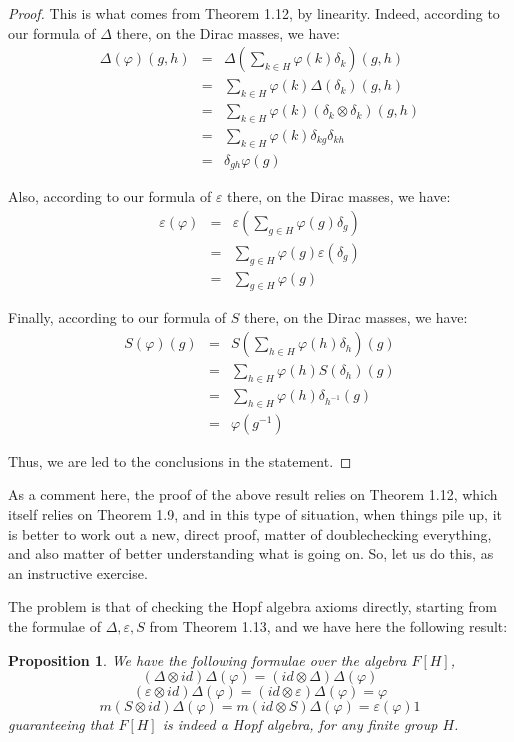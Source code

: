 \documentclass[12pt]{amsbook}
\newtheorem{proposition}[theorem]{Proposition}
\begin{document}
\begin{proof}
This is what comes from Theorem 1.12, by linearity. Indeed, according to our formula of $\Delta$ there, on the Dirac masses, we have:
\begin{eqnarray*}
\Delta(\varphi)(g,h)
&=&\Delta\left(\sum_{k\in H}\varphi(k)\delta_k\right)(g,h)\\
&=&\sum_{k\in H}\varphi(k)\Delta(\delta_k)(g,h)\\
&=&\sum_{k\in H}\varphi(k)(\delta_k\otimes\delta_k)(g,h)\\
&=&\sum_{k\in H}\varphi(k)\delta_{kg}\delta_{kh}\\
&=&\delta_{gh}\varphi(g)
\end{eqnarray*}

Also, according to our formula of $\varepsilon$ there, on the Dirac masses, we have:
\begin{eqnarray*}
\varepsilon(\varphi)
&=&\varepsilon\left(\sum_{g\in H}\varphi(g)\delta_g\right)\\
&=&\sum_{g\in H}\varphi(g)\varepsilon(\delta_g)\\
&=&\sum_{g\in H}\varphi(g)
\end{eqnarray*}

Finally, according to our formula of $S$ there, on the Dirac masses, we have:
\begin{eqnarray*}
S(\varphi)(g)
&=&S\left(\sum_{h\in H}\varphi(h)\delta_h\right)(g)\\
&=&\sum_{h\in H}\varphi(h)S(\delta_h)(g)\\
&=&\sum_{h\in H}\varphi(h)\delta_{h^{-1}}(g)\\
&=&\varphi(g^{-1})
\end{eqnarray*}

Thus, we are led to the conclusions in the statement.
\end{proof}

As a comment here, the proof of the above result relies on Theorem 1.12, which itself relies on Theorem 1.9, and in this type of situation, when things pile up, it is better to work out a new, direct proof, matter of doublechecking everything, and also matter of better understanding what is going on. So, let us do this, as an instructive exercise.

\bigskip

The problem is that of checking the Hopf algebra axioms directly, starting from the formulae of $\Delta,\varepsilon,S$ from Theorem 1.13, and we have here the following result:

\begin{proposition}
We have the following formulae over the algebra $F[H]$,
$$(\Delta\otimes id)\Delta(\varphi)=(id\otimes \Delta)\Delta(\varphi)$$
$$(\varepsilon\otimes id)\Delta(\varphi)=(id\otimes\varepsilon)\Delta(\varphi)=\varphi$$
$$m(S\otimes id)\Delta(\varphi)=m(id\otimes S)\Delta(\varphi)=\varepsilon(\varphi)1$$
guaranteeing that $F[H]$ is indeed a Hopf algebra, for any finite group $H$.
\end{proposition}
\end{document}
